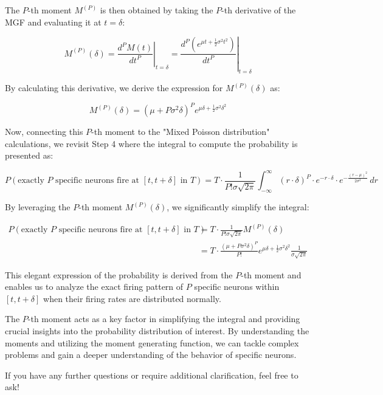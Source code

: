 The \(P\)-th moment \(M^{(P)}\) is then obtained by taking the \(P\)-th derivative of the MGF and evaluating it at \(t = \delta\):

\begin{equation}
M^{(P)}(\delta) = \left. \frac{{d^P M(t)}}{{dt^P}} \right|_{t=\delta} = \left. \frac{{d^P \left( e^{\mu t + \frac{1}{2}\sigma^2 t^2} \right)}}{{dt^P}} \right|_{t=\delta}
\end{equation}

By calculating this derivative, we derive the expression for \(M^{(P)}(\delta)\) as:

\begin{equation}
M^{(P)}(\delta) = (\mu + P\sigma^2\delta)^P e^{\mu\delta + \frac{1}{2}\sigma^2 \delta^2}
\end{equation}

Now, connecting this \(P\)-th moment to the "Mixed Poisson distribution" calculations, we revisit Step 4 where the integral to compute the probability is presented as:

\begin{equation}
P(\text{exactly } P \text{ specific neurons fire at } [t, t + \delta] \text{ in } T) = T \cdot \frac{1}{P! \sigma \sqrt{2\pi}} \int_{-\infty}^{\infty} (r \cdot \delta)^P \cdot e^{-r \cdot \delta} \cdot e^{-\frac{(r-\mu)^2}{2\sigma^2}} \, dr
\end{equation}

By leveraging the \(P\)-th moment \(M^{(P)}(\delta)\), we significantly simplify the integral:

\begin{equation}
\begin{aligned}
P(\text{exactly } P \text{ specific neurons fire at } [t, t + \delta] \text{ in } T) &= T \cdot \frac{1}{P! \sigma \sqrt{2\pi}} M^{(P)}(\delta) \\
&= T \cdot \frac{(\mu + P\sigma^2\delta)^P}{P!} e^{\mu\delta + \frac{1}{2}\sigma^2 \delta^2} \frac{1}{\sigma \sqrt{2\pi}}
\end{aligned}
\end{equation}

This elegant expression of the probability is derived from the \(P\)-th moment and enables us to analyze the exact firing pattern of \(P\) specific neurons within \([t, t + \delta]\) when their firing rates are distributed normally.

The \(P\)-th moment acts as a key factor in simplifying the integral and providing crucial insights into the probability distribution of interest. By understanding the moments and utilizing the moment generating function, we can tackle complex problems and gain a deeper understanding of the behavior of specific neurons.

If you have any further questions or require additional clarification, feel free to ask!

